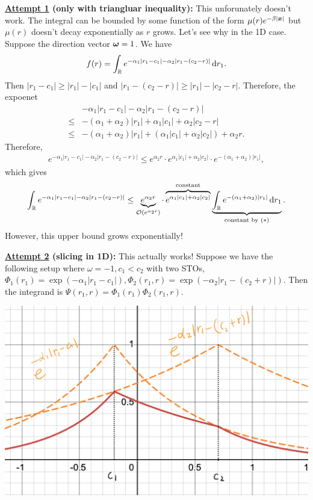 \documentclass[12pt]{article}
\begin{document}
\textbf{\underline{Attempt 1} (only with triangluar inequality):} This unforunately doesn't work. The integral can be bounded by some function of the form \(\mu(r)e^{-\beta|\bm{x}|}\) but \(\mu(r)\) doesn't decay exponentially as \(r\) grows. Let's see why in the 1D case. Suppose the direction vector \(\bm{\omega} = 1\). We have
\begin{align*}
    f(r) = \int_{\mathbb {R}} e^{-\alpha_1|r_1 - c_1| - \alpha_2 |r_1 - (c_2 - r)| } \mathop{}\!\mathrm{d} r_1.
\end{align*}
Then \(|r_1 - c_1| \geq |r_1| - |c_1|\) and \(|r_1 - (c_2 - r)| \geq |r_1| - |c_2 - r|\).
Therefore, the expoenet
\begin{align*}
    &-\alpha_1|r_1 - c_1| - \alpha_2 |r_1 - (c_2 - r)| \\
    \leq& -(\alpha_1 + \alpha_2)|r_1| + \alpha_1|c_1| + \alpha_2|c_2 - r|  \\
    \leq& -(\alpha_1 + \alpha_2)|r_1| + (\alpha_1|c_1| + \alpha_2|c_2|) + \alpha_2 r.
\end{align*}
Therefore,
\begin{align*}
    e^{-\alpha_1|r_1 - c_1| - \alpha_2 |r_1 - (c_2 - r)|} \leq e^{\alpha_2 r} \cdot e^{\alpha_1|c_1| + \alpha_2|c_2|}\cdot e^{-(\alpha_1 + \alpha_2)|r_1|},
\end{align*}
which gives
\begin{align*}
    \int_{\mathbb {R}}  e^{-\alpha_1|r_1 - c_1| - \alpha_2 |r_1 - (c_2 - r)|}
    \leq 
    \underbrace{e^{\alpha_2 r}}_{\mathcal{O}(e^{\alpha_2r})}
    \cdot 
    \overbrace{e^{\alpha_1|c_1| + \alpha_2|c_2|}}^{\text{constant}} 
    \underbrace{\int_{\mathbb {R}} e^{-(\alpha_1 + \alpha_2)|r_1|} \mathop{}\!\mathrm{d} r_1}_{\text{constant by }(\ast)}.
\end{align*}
However, this upper bound grows exponentially!

\textbf{\underline{Attempt 2} (slicing in 1D):} This actually works!
Suppose we have the following setup where \(\omega = -1, c_1 < c_2\) with two STOs, \(\Phi_1(r_1) = \exp(-\alpha_1|r_1-c_1|), \Phi_2(r_1,r) = \exp(-\alpha_2|r_1 - (c_2 + r)|)\).
Then the integrand is \(\Psi(r_1,r) = \Phi_1(r_1) \Phi_2(r_1,r)\). 

\begin{center}
    \includegraphics[scale=0.23]{figure1.jpeg}
\end{center}
\end{document}
